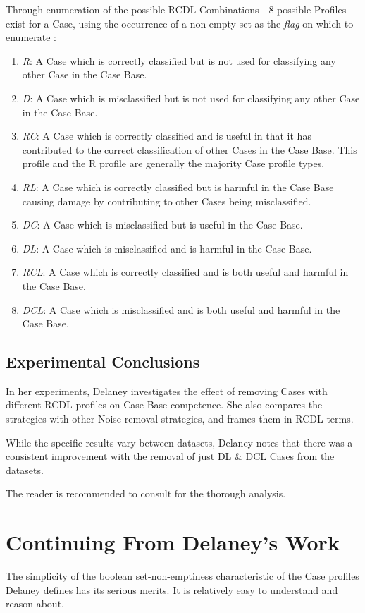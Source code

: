 \documentclass[a4paper,11pt]{report}
\begin{document}
Through enumeration of the possible RCDL Combinations - 8 possible Profiles exist for a Case, using the occurrence of a non-empty set as the \emph{flag} on which to enumerate \citep{Delany2009}:

\begin{enumerate}
	\item \emph{R}: A Case which is correctly classified but is not used for classifying any other Case in the Case Base.
	\item \emph{D}: A Case which is misclassified but is not used for classifying any other Case in the Case Base.
	\item \emph{RC}: A Case which is correctly classified and is useful in that it has contributed to the correct classification of other Cases in the Case Base. This profile and the R profile are generally the majority Case profile types.
	\item \emph{RL}: A Case which is correctly classified but is harmful in the Case Base causing damage by contributing to other Cases being misclassified.
	\item \emph{DC}: A Case which is misclassified but is useful in the Case Base. 
	\item \emph{DL}: A Case which is misclassified and is harmful in the Case Base.
	\item \emph{RCL}: A Case which is correctly classified and is both useful and harmful in the Case Base.
	\item \emph{DCL}: A Case which is misclassified and is both useful and harmful in the Case Base.
\end{enumerate}


\subsection{Experimental Conclusions}
In her experiments, Delaney investigates the effect of removing Cases with different RCDL profiles on Case Base competence. She also compares the strategies with other Noise-removal strategies, and frames them in RCDL terms.

While the specific results vary between datasets, Delaney notes that there was a consistent improvement with the removal of just DL \& DCL Cases from the datasets. 

The reader is recommended to consult \citet{Delany2009} for the thorough analysis.

\section{Continuing From Delaney's Work}
The simplicity of the boolean set-non-emptiness characteristic of the Case profiles Delaney defines has its serious merits. It is relatively easy to understand and reason about. 
\end{document}
